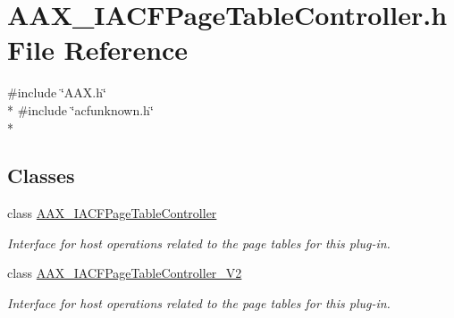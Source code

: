\hypertarget{a00230}{}\section{A\+A\+X\+\_\+\+I\+A\+C\+F\+Page\+Table\+Controller.\+h File Reference}
\label{a00230}
{\ttfamily \#include \char`\"{}A\+A\+X.\+h\char`\"{}}\\*
{\ttfamily \#include \char`\"{}acfunknown.\+h\char`\"{}}\\*
\subsection*{Classes}
\begin{DoxyCompactItemize}
\item 
class \hyperlink{a00076}{A\+A\+X\+\_\+\+I\+A\+C\+F\+Page\+Table\+Controller}
\begin{DoxyCompactList}\small\item\em Interface for host operations related to the page tables for this plug-\/in. \end{DoxyCompactList}\item 
class \hyperlink{a00077}{A\+A\+X\+\_\+\+I\+A\+C\+F\+Page\+Table\+Controller\+\_\+\+V2}
\begin{DoxyCompactList}\small\item\em Interface for host operations related to the page tables for this plug-\/in. \end{DoxyCompactList}\end{DoxyCompactItemize}

